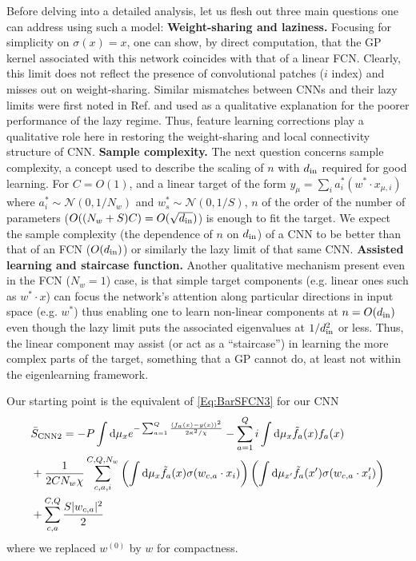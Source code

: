 Before delving into a detailed analysis, let us flesh out three main questions one can address using such a model: {\bf Weight-sharing and laziness.} Focusing for simplicity on $\sigma(x)=x$, one can show, by direct computation, that the GP kernel associated with this network coincides with that of a linear FCN. Clearly, this limit does not reflect the presence of convolutional patches ($i$ index) and misses out on weight-sharing. Similar mismatches between CNNs and their lazy limits were first noted in Ref. \cite{novak2019neural} and used as a qualitative explanation for the poorer performance of the lazy regime. Thus, feature learning corrections play a qualitative role here in restoring the weight-sharing and local connectivity structure of CNN. {\bf Sample complexity.} The next question concerns sample complexity, a concept used to describe the scaling of $n$ with $d_{\text{in}}$ required for good learning. For $C=O(1)$, and a linear target of the form $y_{\mu} = \sum_{i} a^*_i ({w}^* \cdot {x}_{\mu,i})$ where $a^*_i \sim {\mathcal N}(0,1/N_w)$ and $w^*_s \sim {\mathcal N}(0,1/S)$, $n$ of the order of the number of parameters ($O((N_w+S)C)=O(\sqrt{d_{\text{in}}})$) is enough to fit the target. We expect the sample complexity (the dependence of $n$ on $d_{\text{in}}$) of a CNN to be better than that of an FCN ($O(d_{\text{in}})$) or similarly the lazy limit of that same CNN. {\bf Assisted learning and staircase function.} Another qualitative mechanism \citep{abbe2021staircasepropertyhierarchicalstructure,dandi2023twolayerneuralnetworkslearn} present even in the FCN ($N_w=1$) case, is that simple target components (e.g. linear ones such as $w^* \cdot x$) can focus the network's attention along particular directions in input space (e.g. ${w}^*$) thus enabling one to learn non-linear components at $n=O(d_{\text{in}})$ even though the lazy limit puts the associated eigenvalues at $1/d^{2}_{\text{in}}$ or less. Thus, the linear component may assist (or act as a ``staircase'') in learning the more complex parts of the target, something that a GP cannot do, at least not within the eigenlearning framework. 

Our starting point is the equivalent of \ref{Eq:BarSFCN3} for our CNN 
\begin{align}
\label{Eq:S_CNN2}
&\bar{S}_{\text{CNN2}}= -P\int \text{d}\mu_x e^{-\sum_{a=1}^Q \frac{(f_a(x)-y(x))^2}{2\kappa^2/\chi}} - \sum_{a=1}^Q i\int \text{d}\mu_x \tilde{f}_a(x) f_a(x) \\ \nonumber 
&+\frac{1}{2CN_w \chi} \sum_{c,a,i}^{C,Q,N_w} \left(\int \text{d}\mu_x \tilde{f}_a(x) \sigma({w}_{c,a} \cdot {x}_i)\right)\left(\int \text{d}\mu_{x'} \tilde{f}_a(x') \sigma({w}_{c,a} \cdot {x}'_i)\right) \\ \nonumber &+ \sum_{c,a}^{C,Q}\frac{S |{ w_{c,a}}|^2}{2}
\end{align}
where we replaced ${w}^{(0)}$ by ${w}$ for compactness. 


